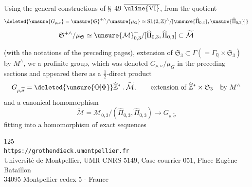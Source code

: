 Using the general constructions of \S~49 $\overline{\uline{\mathrm{VI}}}$,  from the quotient
\[
\deleted{\unsure{G_{\rho,\sigma}}=\unsure{\mathfrak S}^{+\wedge}/\unsure{\mu_G}\simeq
\operatorname{SL}(2,\mathbb Z)^\wedge/
[\unsure{\widehat\Pi_{0,3}},\unsure{\widehat\Pi_{0,3}}]}
\]
\[
\mathfrak S^{+\wedge}/\mu_{\mathfrak S}\simeq
\unsure{\mathcal M}_{0,3}^{+}/[\widehat\Pi_{0,3},\widehat\Pi_{0,3}]
\subset\widetilde{\mathcal M}
\]


 (with the notations of the preceding pages), extension of $\mathfrak S_3\subset\Gamma(=\Gamma_{\mathbb Q}\times\mathfrak S_3)$ by $M^\wedge$, we  a profinite group,  which was denoted $G_{\rho,\sigma}/\mu_G$  in the preceding sections and appeared there as a $\frac12$-direct product
\[
G_{\rho,\widetilde\sigma}
=\deleted{\unsure{\mathbb O|\Phi}}\widehat{\mathbb Z}^{*}\mathbin{.}\widetilde{\mathcal M},
\qquad\text{extension of }\widehat{\mathbb Z}^{*}\times\mathfrak S_3
\quad\text{by }M^\wedge
\]
and a canonical homomorphism
\[
\widetilde{\mathcal M}
=\mathcal M_{0,3}/(\widehat\Pi_{0,3},\widehat\Pi_{0,3})
\longrightarrow G_{\rho,\widetilde\sigma}
\]
fitting into a homomorphism of exact sequences


\begin{center}
\small
125\\
\texttt{https://grothendieck.umontpellier.fr}\\
Université de Montpellier, UMR CNRS 5149, Case courrier 051, Place Eugène Bataillon\\
34095 Montpellier cedex 5 - France
\end{center}


\diagram{
\[
\begin{tikzcd}[column sep=large,row sep=huge]
1 \arrow[r,no head] &
\widehat M \arrow[r] \arrow[d,Rightarrow] &
\widetilde{\mathcal M} \arrow[r] \arrow[d] &
\underbrace{\Gamma}_{N_{0,3}=\Gamma_{\mathbb Q}\times\mathfrak S_3}
\arrow[r,no head] \arrow[d,"\unsure{\chi}\times\operatorname{id}_{\mathfrak S_3}"] & 1 \\
1 \arrow[r,no head] &
\widehat M \arrow[r,no head] &
G_{\rho,\widetilde\sigma} \arrow[r] &
\widehat{\mathbb Z}^{*}\times\mathfrak S_3 \arrow[r,no head] & 1 .
\end{tikzcd}
\tag{282}
\]
}


